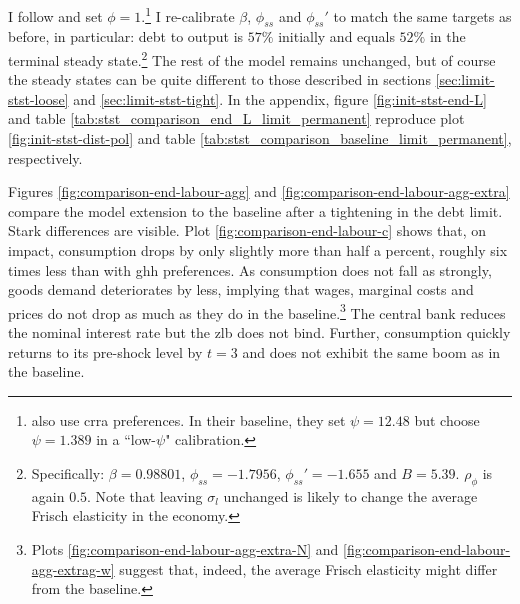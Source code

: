 \documentclass[a4paper,12pt]{article} %
\numberwithin{equation}{section} %
\numberwithin{figure}{section}
\numberwithin{table}{section}
\begin{document}
I follow \textcite{mckay2016} and set $\phi=1$.\footnote{\textcite{gl2017} also use \Gls{crra} preferences. In their baseline, they set $\psi = 12.48$ but choose $\psi = 1.389$ in a ``low-$\psi$" calibration.} I re-calibrate $\beta$, $\phi_{ss}$ and $\phi_{ss}'$ to match the same targets as before, in particular: debt to output is $57\%$ initially and equals $52\%$ in the terminal steady state.\footnote{Specifically: $\beta = 0.98801$, $\phi_{ss} = -1.7956$, $\phi_{ss}' = -1.655$ and $B = 5.39$. $\rho_{\phi}$ is again $0.5$. Note that leaving $\sigma_l$ unchanged is likely to change the average Frisch elasticity in the economy.} The rest of the model remains unchanged, but of course the steady states can be quite different to those described in sections \ref{sec:limit-stst-loose} and \ref{sec:limit-stst-tight}. In the appendix, figure \ref{fig:init-stst-end-L} and table \ref{tab:stst_comparison_end_L_limit_permanent} reproduce plot \ref{fig:init-stst-dist-pol} and table \ref{tab:stst_comparison_baseline_limit_permanent}, respectively.

Figures \ref{fig:comparison-end-labour-agg} and \ref{fig:comparison-end-labour-agg-extra} compare the model extension to the baseline after a tightening in the debt limit. Stark differences are visible. Plot \ref{fig:comparison-end-labour-c} shows that, on impact, consumption drops by only slightly more than half a percent, roughly six times less than with \Gls{ghh} preferences. As consumption does not fall as strongly, goods demand deteriorates by less, implying that wages, marginal costs and prices do not drop as much as they do in the baseline.\footnote{Plots \ref{fig:comparison-end-labour-agg-extra-N} and \ref{fig:comparison-end-labour-agg-extrag-w} suggest that, indeed, the average Frisch elasticity might differ from the baseline.} The central bank reduces the nominal interest rate but the \Gls{zlb} does not bind. Further, consumption quickly returns to its pre-shock level by $t=3$ and does not exhibit the same boom as in the baseline. 
\end{document}
